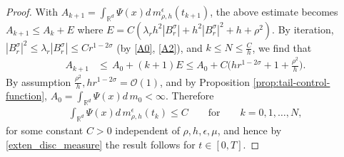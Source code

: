 \documentclass[a4paper,  twoside, 10pt, leqno]{amsart}
\newcommand{\R}{\mathbb{R}}
\theoremstyle{remark}
\theoremstyle{definition}
\begin{document}
\begin{proof}
With $A_{k+1} = \int_{\R^d} \Psi(x) d\,m^{\epsilon}_{\rho,h}(t_{k+1})$, the above estimate becomes
$A_{k+1} \leq  A_k + E$ where $E=C (\lambda_r h^2 |B_r^{\sigma}| + h^2 |B_r^{\sigma}|^2 + h + \rho^{2})$. 
 By iteration, $ |B^{\sigma}_r|^2\leq \lambda_r |B_r^{\sigma}| \leq C r^{1-2\sigma}$ (by \ref{A0}, \ref{A2}), and $k\leq N \leq \frac Ch$, we find that
\begin{align} \label{esti_tight_m_rho-h}
 A_{k+1} & \leq  \, A_0 +  (k+1) E 
\leq  A_0 + C\Big( h r^{1-2\sigma} +1 +\frac{\rho^{2}}{h} \Big) .
\end{align}
By assumption $\frac{\rho^{2}}{h},h r^{1-2\sigma}=\mathcal{O}(1)$, and by Proposition \ref{prop:tail-control-function}, $A_0 = \int_{\R^d} \Psi(x) d\,m_0<\infty$. Therefore
\begin{align*}
\int_{\R^d} \Psi(x) d\,m^{\epsilon}_{\rho,h}(t_k) \leq C \qquad \mbox{for} \qquad k=0,1,\dots,N ,
\end{align*} 
for some constant $C>0$ independent of $\rho,h,\epsilon, \mu$, and hence by \eqref{exten_disc_measure} the result follows for $t\in[0,T]$.
\end{proof}
\end{document}
